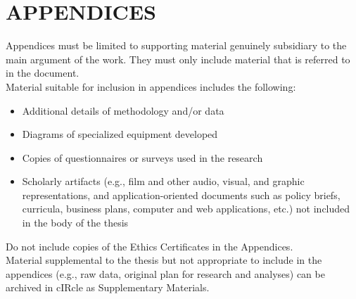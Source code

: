 \chapter{APPENDICES}
  Appendices must be limited to supporting material genuinely subsidiary to the main argument of the 
    work. They must only include material that is referred to in the document. \\
  Material suitable for inclusion in appendices includes the following:
  \begin{itemize} 
    \item Additional details of methodology and/or data
    \item Diagrams of specialized equipment developed
    \item Copies of questionnaires or surveys used in the research
    \item Scholarly artifacts (e.g., film and other audio, visual, and graphic representations, and 
      application-oriented documents such as policy briefs, curricula, business plans, computer and 
      web applications, etc.) not included in the body of the thesis
  \end{itemize}
  Do not include copies of the Ethics Certificates in the Appendices. \\
  Material supplemental to the thesis but not appropriate to include in the appendices (e.g., raw 
    data, original plan for research and analyses) can be archived in cIRcle as Supplementary 
    Materials.



